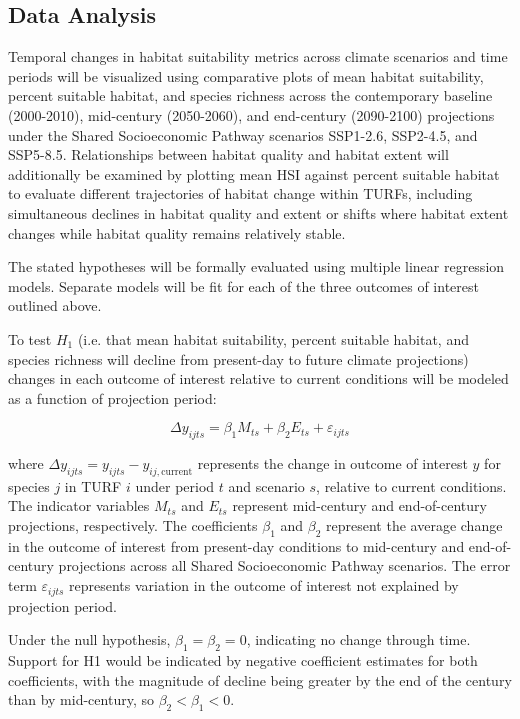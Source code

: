 \documentclass[12pt]{article}
\begin{document}
\subsection{Data Analysis}\label{sec:data_analysis}

Temporal changes in habitat suitability metrics across climate scenarios and time periods will be visualized using comparative plots of mean habitat suitability, percent suitable habitat, and species richness across the contemporary baseline (2000-2010), mid-century (2050-2060), and end-century (2090-2100) projections under the Shared Socioeconomic Pathway scenarios SSP1-2.6, SSP2-4.5, and SSP5-8.5. Relationships between habitat quality and habitat extent will additionally be examined by plotting mean HSI against percent suitable habitat to evaluate different trajectories of habitat change within TURFs, including simultaneous declines in habitat quality and extent or shifts where habitat extent changes while habitat quality remains relatively stable.

The stated hypotheses will be formally evaluated using multiple linear regression models. Separate models will be fit for each of the three outcomes of interest outlined above.

To test $H_1$ (i.e. that mean habitat suitability, percent suitable habitat, and species richness will decline from present-day to future climate projections) changes in each outcome of interest relative to current conditions will be modeled as a function of projection period:

\begin{equation}
\Delta y_{ijts} = \beta_1 M_{ts} + \beta_2 E_{ts} + \varepsilon_{ijts}
\label{eq:h1_regression}
\end{equation}

where $\Delta y_{ijts} = y_{ijts} - y_{ij,\mathrm{current}}$ represents the change in outcome of interest $y$ for species $j$ in TURF $i$ under period $t$ and scenario $s$, relative to current conditions. The indicator variables $M_{ts}$ and $E_{ts}$ represent mid-century and end-of-century projections, respectively. The coefficients $\beta_1$ and $\beta_2$ represent the average change in the outcome of interest from present-day conditions to mid-century and end-of-century projections across all Shared Socioeconomic Pathway scenarios. The error term $\varepsilon_{ijts}$ represents variation in the outcome of interest not explained by projection period.

Under the null hypothesis, $\beta_1 = \beta_2 = 0$, indicating no change through time. Support for H1 would be indicated by negative coefficient estimates for both coefficients, with the magnitude of decline being greater by the end of the century than by mid-century, so $\beta_2 < \beta_1 < 0$.
\end{document}
